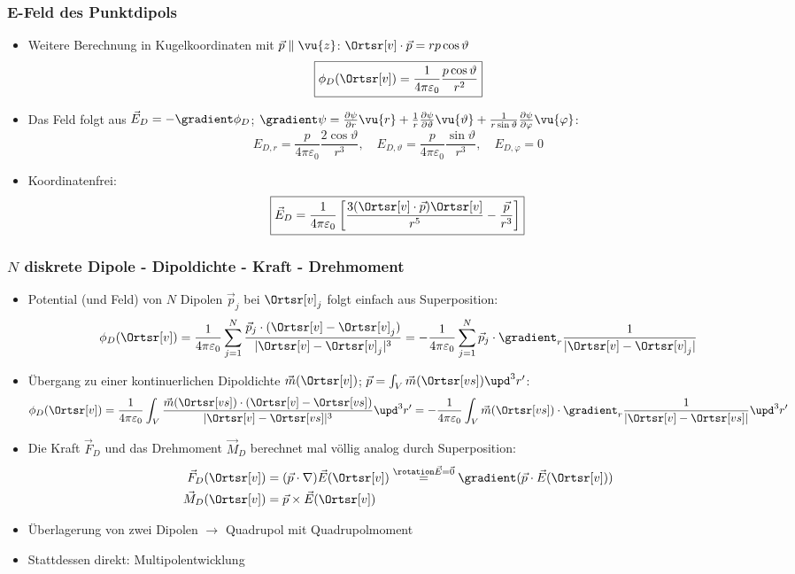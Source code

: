   \begin{frame}
    \frametitle{E-Feld des Punktdipols}
    \begin{itemize}[<+->]
    \item Weitere Berechnung in Kugelkoordinaten mit $\vec{p}\parallel\vu{z}$: $\Ortsr[v]\cdot\vec{p} = r p \cos\vartheta$
      $$
    \boxed{\phi_D(\Ortsr[v]) = \frac{1}{4\pi\varepsilon_0} \frac{p\cos\vartheta}{r^2} }
    $$
  \item Das Feld folgt aus $\vec{E}_D = -\gradient \phi_D $; $\gradient\psi = \frac{\partial\psi}{\partial r}\vu{r} + \frac{1}{r} \frac{\partial\psi}{\partial \vartheta}\vu{\vartheta} + \frac{1}{r\sin\vartheta} \frac{\partial\psi}{\partial \varphi}\vu{\varphi}$:
    $$
    \boxed{E_{D,r} = \frac{p}{4\pi\varepsilon_0} \frac{2\cos\vartheta}{r^3}, \quad E_{D,\vartheta} = \frac{p}{4\pi\varepsilon_0} \frac{\sin\vartheta}{r^3}, \quad E_{D,\varphi} = 0 }
    $$
  \item Koordinatenfrei:
    $$
    \boxed{\vec{E}_{D} = \frac{1}{4\pi\varepsilon_0}\left[ \frac{3(\Ortsr[v]\cdot\vec{p}) \Ortsr[v]}{r^5} -\frac{\vec{p}}{r^3} \right]}    
    $$
      \end{itemize}
    \end{frame}

    \begin{frame}
      \frametitle{$N$ diskrete Dipole - Dipoldichte - Kraft - Drehmoment}
      \begin{itemize}[<+->]
        \item Potential (und Feld) von $N$ Dipolen $\vec{p}_j$ bei $\Ortsr[v]_j$ folgt einfach aus Superposition:
        $$
        \phi_D(\Ortsr[v]) = \frac{1}{4\pi\varepsilon_0} \sum_{j=1}^N \frac{\vec{p}_j\cdot ( \Ortsr[v]-\Ortsr[v]_j)}{|\Ortsr[v]-\Ortsr[v]_j|^3} = -\frac{1}{4\pi\varepsilon_0} \sum_{j=1}^N \vec{p}_j\cdot \gradient_r \frac{1}{|\Ortsr[v]-\Ortsr[v]_j|}   
        $$
      \item Übergang zu einer kontinuerlichen \alert{Dipoldichte} $\vec{m}(\Ortsr[v])$; $\vec{p} = \int_V \vec{m}(\Ortsr[vs])\upd^3 r'$:
        $$
        \phi_D(\Ortsr[v]) = \frac{1}{4\pi\varepsilon_0} \int_V \frac{\vec{m}(\Ortsr[vs])\cdot ( \Ortsr[v]-\Ortsr[vs])}{|\Ortsr[v]-\Ortsr[vs]|^3} \upd^3 r'= -\frac{1}{4\pi\varepsilon_0} \int_V \vec{m}(\Ortsr[vs])\cdot \gradient_r \frac{1}{|\Ortsr[v]-\Ortsr[vs]|}  \upd^3 r'  
        $$
      \item Die \alert{Kraft} $\vec{F}_D$ und das \alert{Drehmoment} $\vec{M}_D$ berechnet mal völlig analog durch Superposition:
        \begin{align*}
          \vec{F}_D(\Ortsr[v]) &= (\vec{p}\cdot\nabla) \vec{E}(\Ortsr[v]) \stackrel{\rotation\vec{E}=\vec{0}}{=} \gradient(\vec{p}\cdot \vec{E}(\Ortsr[v]))\\
          \vec{M}_D(\Ortsr[v]) &= \vec{p} \times \vec{E}(\Ortsr[v])
        \end{align*}
      \item Überlagerung von zwei Dipolen $\to$ \alert{Quadrupol} mit \alert{Quadrupolmoment}
        \item Stattdessen direkt: \alert{Multipolentwicklung}
        \end{itemize}
      \end{frame}


